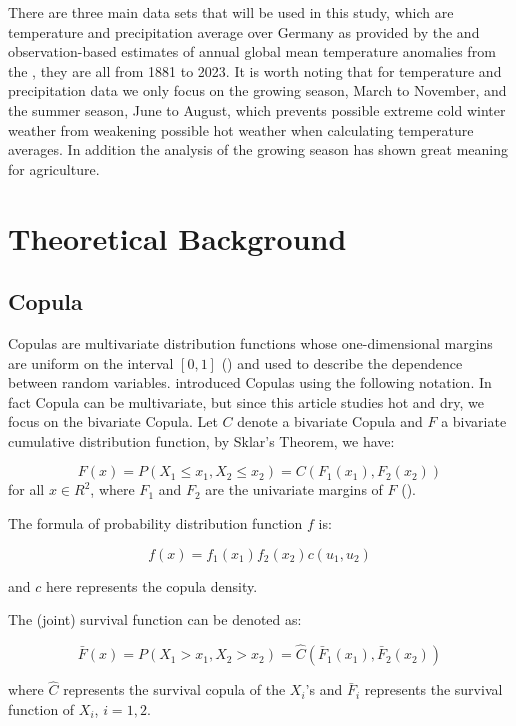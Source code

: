 \documentclass[
]{krantz}
\begin{document}
There are three main data sets that will be used in this study, which are temperature and precipitation average over Germany as provided by the \citet{dwd2024b} and observation-based estimates of annual global mean temperature anomalies from the \citet{giss2024}, they are all from 1881 to 2023. It is worth noting that for temperature and precipitation data we only focus on the growing season, March to November, and the summer season, June to August, which prevents possible extreme cold winter weather from weakening possible hot weather when calculating temperature averages. In addition the analysis of the growing season has shown great meaning for agriculture.

\section{Theoretical Background}\label{theoretical-background}

\subsection{Copula}\label{copula}

Copulas are multivariate distribution functions whose one-dimensional margins are uniform on the interval \([0,1]\) (\citet{nelsen2006}) and used to describe the dependence between random variables. \citet{salvadori2016} introduced Copulas using the following notation. In fact Copula can be multivariate, but since this article studies hot and dry, we focus on the bivariate Copula. Let \(C\) denote a bivariate Copula and \(F\) a bivariate cumulative distribution function, by Sklar's Theorem, we have:

\[F(x) = P(X_1 \leq x_1, X_2 \leq x_2) = C(F_{1}(x_1), F_{2}(x_2)) \tag{1} \]
for all \(x \in R^2\), where \(F_1\) and \(F_2\) are the univariate margins of \(F\) (\citet{sklar1959}).

The formula of probability distribution function \(f\) is:

\[f(x) = f_1(x_1) f_2(x_2) c(u_1, u_2) \tag{2} \]

and \(c\) here represents the copula density.

The (joint) survival function can be denoted as:

\[\bar{F}(x) = P(X_1 > x_1, X_2 > x_2) = \hat{C}( \bar{F}_1(x_1), \bar{F}_2(x_2)) \tag{3} \]

where \(\hat{C}\) represents the survival copula of the \(X_i\)'s and \(\bar{F}_i\) represents the survival function of \(X_i\), \(i = 1, 2\).
\end{document}
